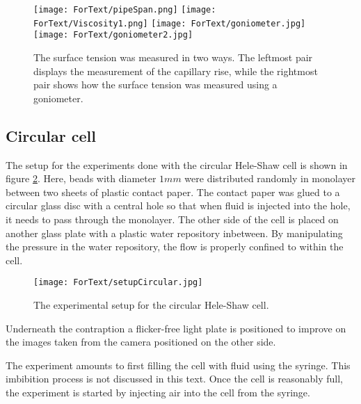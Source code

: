 \documentclass[twoside,utf8]{article}
\begin{document}
\begin{figure}[H]
	\begin{center}
		\texttt{[image: ForText/pipeSpan.png]}
		\texttt{[image: ForText/Viscosity1.png]}
		\texttt{[image: ForText/goniometer.jpg]}
		\texttt{[image: ForText/goniometer2.jpg]}
	\end{center}
	\caption{The surface tension was measured in two ways. The leftmost pair displays the measurement of the capillary rise, while the rightmost pair shows how the surface tension was measured using a goniometer. }
	\label{fig:SurfaceTension}
\end{figure}



\subsection{Circular cell}
The setup for the experiments done with the circular Hele-Shaw cell is shown in figure \ref{fig:setupCircular}.  Here, beads with diameter $1mm$ were distributed randomly in monolayer between two sheets of plastic contact paper. The contact paper was glued to a circular glass disc with a central hole so that when fluid is injected into the hole, it needs to pass through the monolayer. The other side of the cell is placed on another glass plate with a plastic water repository inbetween. By manipulating the pressure in the water repository, the flow is properly confined to within the cell.


\begin{figure}[H]
	\begin{center}
	\texttt{[image: ForText/setupCircular.jpg]}
	\end{center}
	\caption{The experimental setup for the circular Hele-Shaw cell. }
	\label{fig:setupCircular}
\end{figure}

\noindent
Underneath the contraption a flicker-free light plate is positioned to improve on the images taken from the camera positioned on the other side.

The experiment amounts to first filling the cell with fluid using the syringe. This imbibition process is not discussed in this text. Once the cell is reasonably full, the experiment is started by injecting air into the cell from the syringe.
\end{document}
